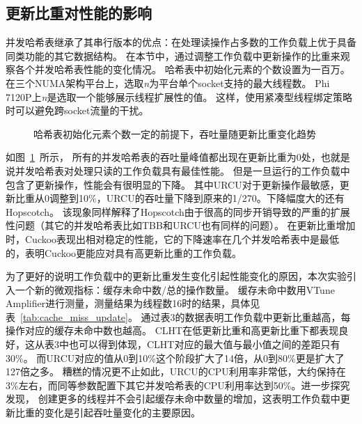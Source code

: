 \subsection{更新比重对性能的影响}
\label{sec:impact_update}
并发哈希表继承了其串行版本的优点：在处理读操作占多数的工作负载上优于具备同类功能的其它数据结构。
在本节中，通过调整工作负载中更新操作的比重来观察各个并发哈希表性能的变化情况。
哈希表中初始化元素的个数设置为一百万。
在三个NUMA架构平台上，选取\textit{n}为平台单个socket支持的最大线程数。
Phi 7120P上\textit{n}是选取一个能够展示线程扩展性的值。
这样，使用紧凑型线程绑定策略时可以避免跨socket流量的干扰。

\begin{figure}[htbp]
\centering
\subfigure[Phi 7120P, n = 60]{\texttt{[image: 7120U10]}}
\caption{哈希表初始化元素个数一定的前提下，吞吐量随更新比重变化趋势}
\label{fig:update}
\end{figure}

如图~\ref{fig:update}~所示，
所有的并发哈希表的吞吐量峰值都出现在更新比重为0处，也就是说并发哈希表对处理只读的工作负载具有最佳性能。
但是一旦运行的工作负载中包含了更新操作，性能会有很明显的下降。
其中URCU对于更新操作最敏感，更新比重从0调整到10\%，URCU的吞吐量下降到原来的1/270。下降幅度大的还有Hopscotch。
该现象同样解释了Hopscotch由于很高的同步开销导致的严重的扩展性问题（其它的并发哈希表比如TBB和URCU也有同样的问题）。
在更新比重增加时，Cuckoo表现出相对稳定的性能，它的下降速率在几个并发哈希表中是最低的，表明Cuckoo更能应对具有高更新比重的工作负载。

为了更好的说明工作负载中的更新比重发生变化引起性能变化的原因，本次实验引入一个新的微观指标：缓存未命中数/总的操作数量。
缓存未命中数用VTune Amplifier进行测量，测量结果为线程数16时的结果，具体见表~\ref{tab:cache_miss_update}。
通过表3的数据表明工作负载中更新比重越高，每操作对应的缓存未命中数也越高。
CLHT在低更新比重和高更新比重下都表现良好，这从表3中也可以得到体现，CLHT对应的最大值与最小值之间的差距只有30\%。
而URCU对应的值从0到10\%这个阶段扩大了14倍，从0到80\%更是扩大了127倍之多。
糟糕的情况更不止如此，URCU的CPU利用率非常低，大约保持在3\%左右，而同等参数配置下其它并发哈希表的CPU利用率达到50\%。进一步探究发现，
创建更多的线程并不会引起缓存未命中数量的增加，这表明工作负载中更新比重的变化是引起吞吐量变化的主要原因。

